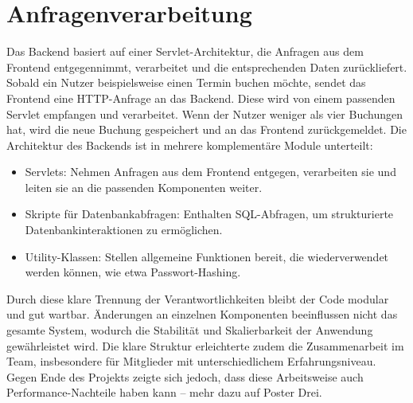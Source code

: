 \section*{Anfragenverarbeitung}
Das Backend basiert auf einer Servlet-Architektur, die Anfragen aus dem Frontend 
entgegennimmt, verarbeitet und die entsprechenden Daten zurückliefert. Sobald ein Nutzer 
beispielsweise einen Termin buchen möchte, sendet das Frontend eine HTTP-Anfrage an das 
Backend. Diese wird von einem passenden Servlet empfangen und verarbeitet. Wenn der 
Nutzer weniger als vier Buchungen hat, wird die neue Buchung gespeichert und an das 
Frontend zurückgemeldet.
Die Architektur des Backends ist in mehrere komplementäre Module unterteilt:
\begin{itemize}
    \item Servlets: Nehmen Anfragen aus dem Frontend entgegen, verarbeiten sie und leiten sie an die passenden Komponenten weiter.
    \item Skripte für Datenbankabfragen: Enthalten SQL-Abfragen, um strukturierte Datenbankinteraktionen zu ermöglichen.
    \item Utility-Klassen: Stellen allgemeine Funktionen bereit, die wiederverwendet werden können, wie etwa Passwort-Hashing.
\end{itemize}
Durch diese klare Trennung der Verantwortlichkeiten bleibt der Code modular und gut 
wartbar. Änderungen an einzelnen Komponenten beeinflussen nicht das gesamte System, 
wodurch die Stabilität und Skalierbarkeit der Anwendung gewährleistet wird. Die klare
Struktur erleichterte zudem die Zusammenarbeit im Team, insbesondere für Mitglieder mit 
unterschiedlichem Erfahrungsniveau. Gegen Ende des Projekts zeigte sich jedoch, dass 
diese Arbeitsweise auch Performance-Nachteile haben kann – mehr dazu auf Poster Drei. 
